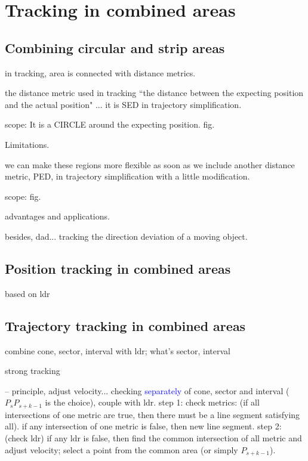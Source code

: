 

\section{Tracking in combined areas}
\label{sec:combine}


\subsection{Combining circular and strip areas}
in tracking, area is connected with distance metrics.

the distance metric used in tracking ``the distance between the expecting position and the actual position" ... it is SED in trajectory simplification. 

scope: It is  a CIRCLE around the expecting position. fig.

Limitations.

we can make these regions more flexible as soon as we include another distance metric, PED, in trajectory simplification with a little modification.

scope: fig.

advantages and applications.

besides, dad... tracking the direction deviation of a moving object.


\subsection{Position tracking in combined areas}
based on ldr




\subsection{Trajectory tracking in combined areas}

combine cone, sector, interval with ldr; what's sector, interval


strong tracking

-- principle, adjust velocity...
	checking \textcolor{blue}{separately} of cone, sector and interval ($P_sP_{s+k-1}$ is the choice), couple with ldr.
	step 1: check metrics: (if all intersections of one metric are true, then there must be a line segment satisfying all).
	if any intersection of one metric is false, then new line segment.
	step 2:	(check ldr) if any ldr is false, then find the common intersection of all metric and adjust velocity; select a point from the common area (or simply $P_{s+k-1}$).


